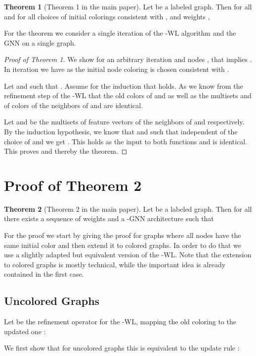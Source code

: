 \documentclass[letterpaper]{article}
\theoremstyle{definition}
\newtheorem{theorem}{Theorem}
\begin{document}
\begin{theorem}[Theorem 1 in the main paper]\label{thm:refine:restated}
	Let  be a labeled graph. Then for all  and for all choices of initial colorings  consistent with , and weights ,
	
\end{theorem}
For the theorem we consider a single iteration of the -WL algorithm and the GNN on a single graph.
\begin{proof}[Proof of Theorem 1]
	We show for an arbitrary iteration  and nodes , that  implies . In iteration  we have  as the initial node coloring  is chosen consistent with .
				
	Let  and  such that .
	Assume for the induction that  holds.
	As  we know from the refinement step of the -WL that the old colors  of  and  as well as the multisets  and  of colors of the neighbors of  and  are identical.
				
	Let  and  be the multisets of feature vectors of the neighbors of  and  respectively. By the induction hypothesis, we know that  and  such that independent of the choice of  and  we get . This holds as the input to both functions  and  is identical. This proves  and thereby the theorem.
\end{proof}


\section{Proof of Theorem 2}

\begin{theorem}[Theorem 2 in the main paper]\label{equal:restated}
	Let  be a labeled graph. Then for all  there exists a sequence of weights  and a -GNN architecture such that 
	
\end{theorem}
For the proof we start by giving the proof for graphs where all nodes have the same initial color and then extend it to colored graphs. 
In order to do that we use a slightly adapted but equivalent version of the -WL.
Note that the extension to colored graphs is mostly technical, while the important idea is already contained in the first case.

\subsection{Uncolored Graphs}
Let  be the refinement operator for the -WL, mapping the old coloring  to the updated one :

We first show that for uncolored graphs this is equivalent to the update rule :
\end{document}
